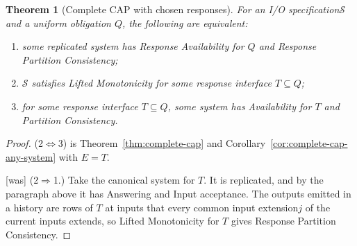 \documentclass[sigconf]{cidr-2027}
\newtheorem{theorem}{Theorem}
\theoremstyle{remark}
\newcommand{\inrel}{extends\xspace}          %
\newcommand{\indesc}{input extension\xspace} %
\newcommand{\Spec}{\mathcal{S}}
\newcommand{\spectype}[1][]{I/O specification#1\xspace}
\begin{document}
\begin{theorem}[Complete CAP with chosen responses]
\label{thm:complete-cap-response}
For an \spectype $\Spec$ and a uniform obligation $Q$,
the following are equivalent:
\begin{enumerate}
  \item some replicated system has Response Availability for $Q$ and
        Response Partition Consistency;
  \item $\Spec$ satisfies Lifted Monotonicity for some response interface $T\subseteq Q$;
  \item for some response interface $T\subseteq Q$, some system has
        Availability for $T$ and Partition Consistency.
\end{enumerate}
\end{theorem}

\begin{proof}
(2$\Leftrightarrow$3) is Theorem~\ref{thm:complete-cap} and
Corollary~\ref{cor:complete-cap-any-system} with $E=T$.



{\footnotesize\color{black!50}\noindent\textsf{[was]} (2$\Rightarrow$1.)  Take the canonical system for $T$.  It is replicated, and by the
paragraph above it has Answering and Input acceptance.  The outputs emitted in
a history are rows of $T$ at inputs that every common \indesc $j$ of the
current inputs \inrel, so Lifted Monotonicity for $T$ gives Response Partition
Consistency.\par}




\end{proof}
\end{document}
